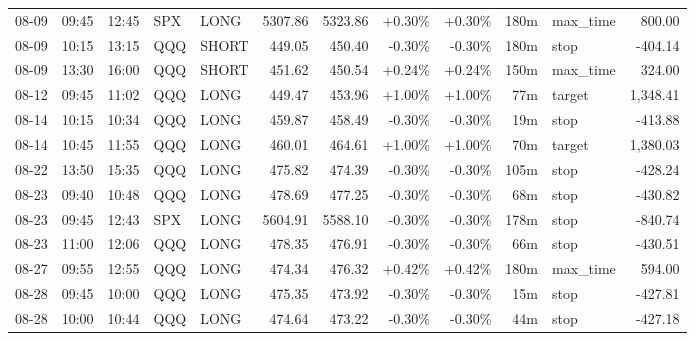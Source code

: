 \documentclass[11pt,a4paper]{article}
\begin{document}
\begin{center}
\begin{longtable}{>{\color{txtmain}}l l l l l r r r r r >{\color{txtmain}}l r}
08-09 & 09:45 & 12:45 & SPX & LONG & 5307.86 & 5323.86 & \textcolor{wingreen}{+0.30\%} & \textcolor{wingreen}{+0.30\%} & 180m & max\_time & \textcolor{wingreen}{800.00} \\
08-09 & 10:15 & 13:15 & QQQ & SHORT & 449.05 & 450.40 & \textcolor{lossred}{-0.30\%} & \textcolor{lossred}{-0.30\%} & 180m & stop & \textcolor{lossred}{-404.14} \\
08-09 & 13:30 & 16:00 & QQQ & SHORT & 451.62 & 450.54 & \textcolor{wingreen}{+0.24\%} & \textcolor{wingreen}{+0.24\%} & 150m & max\_time & \textcolor{wingreen}{324.00} \\
08-12 & 09:45 & 11:02 & QQQ & LONG & 449.47 & 453.96 & \textcolor{wingreen}{+1.00\%} & \textcolor{wingreen}{+1.00\%} & 77m & target & \textcolor{wingreen}{1,348.41} \\
08-14 & 10:15 & 10:34 & QQQ & LONG & 459.87 & 458.49 & \textcolor{lossred}{-0.30\%} & \textcolor{lossred}{-0.30\%} & 19m & stop & \textcolor{lossred}{-413.88} \\
08-14 & 10:45 & 11:55 & QQQ & LONG & 460.01 & 464.61 & \textcolor{wingreen}{+1.00\%} & \textcolor{wingreen}{+1.00\%} & 70m & target & \textcolor{wingreen}{1,380.03} \\
08-22 & 13:50 & 15:35 & QQQ & LONG & 475.82 & 474.39 & \textcolor{lossred}{-0.30\%} & \textcolor{lossred}{-0.30\%} & 105m & stop & \textcolor{lossred}{-428.24} \\
08-23 & 09:40 & 10:48 & QQQ & LONG & 478.69 & 477.25 & \textcolor{lossred}{-0.30\%} & \textcolor{lossred}{-0.30\%} & 68m & stop & \textcolor{lossred}{-430.82} \\
08-23 & 09:45 & 12:43 & SPX & LONG & 5604.91 & 5588.10 & \textcolor{lossred}{-0.30\%} & \textcolor{lossred}{-0.30\%} & 178m & stop & \textcolor{lossred}{-840.74} \\
08-23 & 11:00 & 12:06 & QQQ & LONG & 478.35 & 476.91 & \textcolor{lossred}{-0.30\%} & \textcolor{lossred}{-0.30\%} & 66m & stop & \textcolor{lossred}{-430.51} \\
08-27 & 09:55 & 12:55 & QQQ & LONG & 474.34 & 476.32 & \textcolor{wingreen}{+0.42\%} & \textcolor{wingreen}{+0.42\%} & 180m & max\_time & \textcolor{wingreen}{594.00} \\
08-28 & 09:45 & 10:00 & QQQ & LONG & 475.35 & 473.92 & \textcolor{lossred}{-0.30\%} & \textcolor{lossred}{-0.30\%} & 15m & stop & \textcolor{lossred}{-427.81} \\
08-28 & 10:00 & 10:44 & QQQ & LONG & 474.64 & 473.22 & \textcolor{lossred}{-0.30\%} & \textcolor{lossred}{-0.30\%} & 44m & stop & \textcolor{lossred}{-427.18} \\

\end{longtable}
\end{center}
\end{document}
